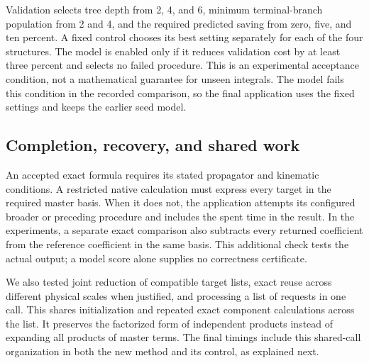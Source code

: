 Validation selects tree depth from 2, 4, and 6, minimum terminal-branch population from 2 and 4, and the required predicted saving from zero, five, and ten percent. A fixed control chooses its best setting separately for each of the four structures. The model is enabled only if it reduces validation cost by at least three percent and selects no failed procedure. This is an experimental acceptance condition, not a mathematical guarantee for unseen integrals. The model fails this condition in the recorded comparison, so the final application uses the fixed settings and keeps the earlier seed model.

\subsection{Completion, recovery, and shared work}
An accepted exact formula requires its stated propagator and kinematic conditions. A restricted native calculation must express every target in the required master basis. When it does not, the application attempts its configured broader or preceding procedure and includes the spent time in the result. In the experiments, a separate exact comparison also subtracts every returned coefficient from the reference coefficient in the same basis. This additional check tests the actual output; a model score alone supplies no correctness certificate.

We also tested joint reduction of compatible target lists, exact reuse across different physical scales when justified, and processing a list of requests in one call. This shares initialization and repeated exact component calculations across the list. It preserves the factorized form of independent products instead of expanding all products of master terms. The final timings include this shared-call organization in both the new method and its control, as explained next.
